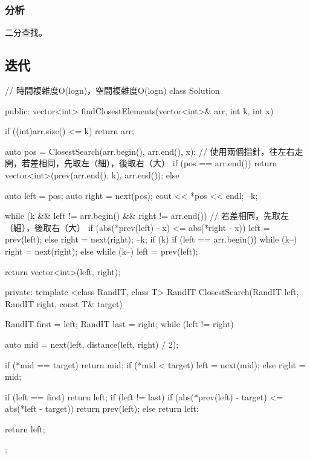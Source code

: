 \subsubsection{分析}
二分查找。


\subsection{迭代}
\begin{Code}
// 時間複雜度O(logn)，空間複雜度O(logn)
class Solution {
public:
    vector<int> findClosestElements(vector<int>& arr, int k, int x) {
        if ((int)arr.size() <= k) return arr;

        auto pos = ClosestSearch(arr.begin(), arr.end(), x);
        // 使用兩個指針，往左右走開，若差相同，先取左（細），後取右（大）
        if (pos == arr.end()) {
            return vector<int>(prev(arr.end(), k), arr.end());
        }
        else {
            auto left = pos;
            auto right = next(pos);
            cout << *pos << endl;
            --k;

            while (k && left != arr.begin() && right != arr.end()) {
                // 若差相同，先取左（細），後取右（大）
                if (abs(*prev(left) - x) <= abs(*right - x))
                    left = prev(left);
                else
                    right = next(right);
                --k;
            }
            if (k) {
                if (left == arr.begin()) {
                    while (k--) right = next(right);
                }
                else {
                    while (k--) left = prev(left);
                }
            }

            return vector<int>(left, right);
        }
    }
private:
    template <class RandIT, class T>
        RandIT ClosestSearch(RandIT left, RandIT right, const T& target) {
        RandIT first = left;
        RandIT last = right;
        while (left != right) {
            auto mid = next(left, distance(left, right) / 2);

            if (*mid == target) return mid;
            if (*mid < target)
                left = next(mid);
            else
                right = mid;
        }

        if (left == first) return left;
        if (left != last) {
            if (abs(*prev(left) - target) <= abs(*left - target))
                return prev(left);
            else
                return left;
        }

        return left;
    }
};
\end{Code}
